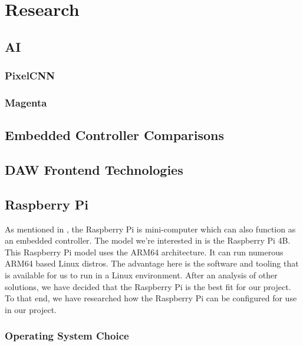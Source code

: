 \section{Research}

\subsection{AI}

\blindtext

\subsubsection{PixelCNN}

\blindtext

\subsubsection{Magenta}

\blindtext

\subsection{Embedded Controller Comparisons}
\label{sec:embedded_controllers}

\blindtext

\subsection{DAW Frontend Technologies}

\blindtext

\subsection{Raspberry Pi}

As mentioned in , the Raspberry Pi is mini-computer
which can also function as an embedded controller. The model we're interested in is the
Raspberry Pi 4B. This Raspberry Pi model uses the ARM64 architecture. It can run numerous
ARM64 based Linux distros. The advantage here is the software and tooling that is
available for us to run in a Linux environment. After an analysis of other solutions, we
have decided that the Raspberry Pi is the best fit for our project. To that end, we have
researched how the Raspberry Pi can be configured for use in our project.

\subsubsection{Operating System Choice}

